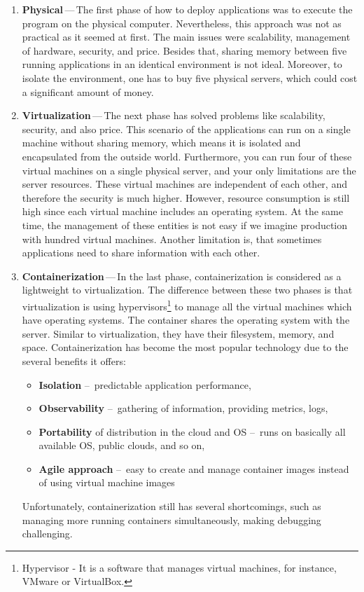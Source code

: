 \begin{enumerate}
    \item \textbf{Physical}\,---\,The first phase of how to deploy applications was to execute the program on the physical computer. Nevertheless, this approach was not as practical as it seemed at first. The main issues were scalability, management of hardware, security, and price. Besides that, sharing memory between five running applications in an identical environment is not ideal. Moreover, to isolate the environment, one has to buy five physical servers, which could cost a significant amount of money. 
    
    \item \textbf{Virtualization}\,---\,The next phase has solved problems like scalability, security, and also price. This scenario of the applications can run on a single machine without sharing memory, which means it is isolated and encapsulated from the outside world. Furthermore, you can run four of these virtual machines on a single physical server, and your only limitations are the server resources. These virtual machines are independent of each other, and therefore the security is much higher. However, resource consumption is still high since each virtual machine includes an operating system. At the same time, the management of these entities is not easy if we imagine production with hundred virtual machines. Another limitation is, that sometimes applications need to share information with each other. 
    
    \item \textbf{Containerization}\,---\,In the last phase, containerization is considered as a lightweight to virtualization. The difference between these two phases is that virtualization is using hypervisors\footnote{Hypervisor - It is a software that manages virtual machines, for instance, VMware or VirtualBox.} to manage all the virtual machines which have operating systems. The container shares the operating system with the server. Similar to virtualization, they have their filesystem, memory, and space. Containerization has become the most popular technology due to the several benefits it offers: 
        \begin{itemize}[itemsep=1mm, parsep=0pt]
            \item \textbf{Isolation} \---\ predictable application performance,
            \item \textbf{Observability} \---\ gathering of information, providing metrics, logs,
            \item \textbf{Portability} of distribution in the cloud and OS \---\ runs on basically all available OS, public clouds, and so on,
            \item \textbf{Agile approach} \---\ easy to create and manage container images instead of using virtual machine images
        \end{itemize}
    Unfortunately, containerization still has several shortcomings, such as managing more running containers simultaneously, making debugging challenging.
    

\end{enumerate}
